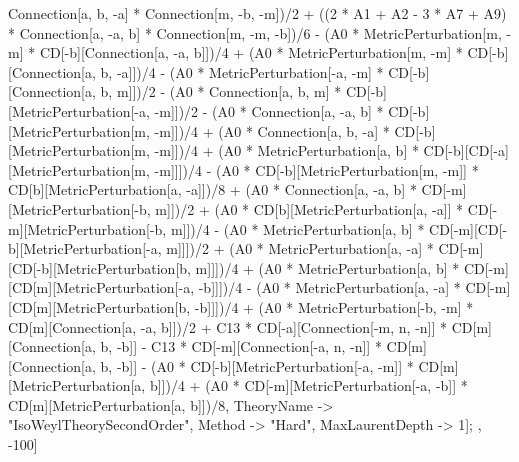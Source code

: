 Connection[a, b, -a] * Connection[m, -b, -m])/2 + ((2 * A1 + A2 - 3 * A7 + A9) * Connection[a, -a, b] * Connection[m, -m, -b])/6 - (A0 * MetricPerturbation[m, -m] * CD[-b][Connection[a, -a, b]])/4 + (A0 * MetricPerturbation[m, -m] * CD[-b][Connection[a, b, -a]])/4 - (A0 * MetricPerturbation[-a, -m] * CD[-b][Connection[a, b, m]])/2 - (A0 * Connection[a, b, m] * CD[-b][MetricPerturbation[-a, -m]])/2 - (A0 * Connection[a, -a, b] * CD[-b][MetricPerturbation[m, -m]])/4 + (A0 * Connection[a, b, -a] * CD[-b][MetricPerturbation[m, -m]])/4 + (A0 * MetricPerturbation[a, b] * CD[-b][CD[-a][MetricPerturbation[m, -m]]])/4 - (A0 * CD[-b][MetricPerturbation[m, -m]] * CD[b][MetricPerturbation[a, -a]])/8 + (A0 * Connection[a, -a, b] * CD[-m][MetricPerturbation[-b, m]])/2 + (A0 * CD[b][MetricPerturbation[a, -a]] * CD[-m][MetricPerturbation[-b, m]])/4 - (A0 * MetricPerturbation[a, b] * CD[-m][CD[-b][MetricPerturbation[-a, m]]])/2 + (A0 * MetricPerturbation[a, -a] * CD[-m][CD[-b][MetricPerturbation[b, m]]])/4 + (A0 * MetricPerturbation[a, b] * CD[-m][CD[m][MetricPerturbation[-a, -b]]])/4 - (A0 * MetricPerturbation[a, -a] * CD[-m][CD[m][MetricPerturbation[b, -b]]])/4 + (A0 * MetricPerturbation[-b, -m] * CD[m][Connection[a, -a, b]])/2 + C13 * CD[-a][Connection[-m, n, -n]] * CD[m][Connection[a, b, -b]] - C13 * CD[-m][Connection[-a, n, -n]] * CD[m][Connection[a, b, -b]] - (A0 * CD[-b][MetricPerturbation[-a, -m]] * CD[m][MetricPerturbation[a, b]])/4 + (A0 * CD[-m][MetricPerturbation[-a, -b]] * CD[m][MetricPerturbation[a, b]])/8, TheoryName -> "IsoWeylTheorySecondOrder", Method -> "Hard", MaxLaurentDepth -> 1]; , -100]